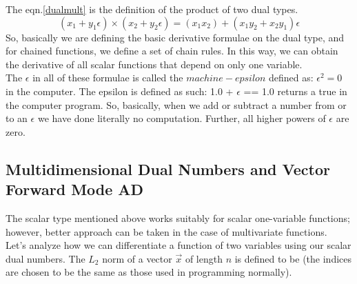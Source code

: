 \documentclass[12pt]{article}
\begin{document}
The eqn.\ref{dualmult} is the definition of the product of two dual types.
\begin{equation}
	\boxed{
	(x_{1}+y_{1}\epsilon) \times (x_{2}+y_{2}\epsilon) = (x_{1}x_{2}) + (x_{1}y_{2}+x_{2}y_{1})\epsilon
}
	\label{dualmult}
\end{equation}
So, basically we are defining the basic derivative formulae on the 
dual type, and for chained functions, we define a set of chain rules. 
In this way, we can obtain the derivative of all scalar functions that depend
on only one variable.
\\
The $\epsilon$ in all of these formulae is called the $machine-epsilon$
defined as: $\epsilon^{2} = 0$ in the computer.
The epsilon is defined as such: 
1.0 + $\epsilon$ == 1.0 returns a true in the computer program.
So, basically, when we add or subtract a number from or to an $\epsilon$
we have done literally no computation. Further, all higher powers of 
$\epsilon$ are zero.
\subsection{Multidimensional Dual Numbers and Vector Forward Mode AD}
The scalar type mentioned above works suitably for scalar one-variable 
functions; however, better approach can be taken in the case of 
multivariate functions.
\\
Let's analyze how we can differentiate a function of two variables 
using our scalar dual numbers.
The $L_{2}$ norm of a vector $\overrightarrow{x}$ of length $n$ is defined to 
be (the indices are chosen to be the same as those used in programming 
normally).
\end{document}
